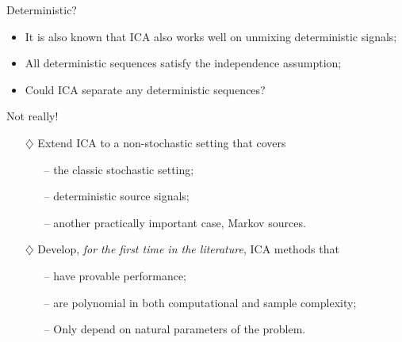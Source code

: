 \documentclass[final]{beamer} %
\begin{document}
\begin{frame}[c]
\begin{columns}[t,totalwidth=\textwidth]
	\begin{column}{.24\textwidth}%
		\begin{block}{Deterministic?}
			\begin{itemize}
				\item It is also known that ICA also works well on unmixing deterministic signals;
				\item All deterministic sequences satisfy the independence assumption;
				\item Could ICA separate any deterministic sequences?
			\end{itemize}
			\begin{center}
				{\large Not really!}
			\end{center}
			
			\vspace{1cm}
			\begin{tcolorbox}[title = \vspace{0.4cm}\textbf{\large Our Contributions} \vspace{0.4cm}, title filled, width = 0.9\textwidth, colback = uofagreen!10, colframe = red]
			\begin{itemize}
			\vspace{0.5cm}
			\item[$\diamondsuit$] Extend ICA to a non-stochastic setting that covers
			\begin{itemize}
			\item[--] the classic stochastic setting;
			\item[--] deterministic source signals;
			\item[--] another practically important case, Markov sources.
			\end{itemize} 
			\vspace{1cm}
			\item[$\diamondsuit$] Develop, \emph{for the first time in the literature}, ICA methods that 
				\begin{itemize}
					\item[--] have provable performance;
					\item[--] are polynomial in both computational and sample complexity;
					\item[--] Only depend on natural parameters of the problem.
				\end{itemize}
			\end{itemize}		
			\end{tcolorbox}
		\end{block}
		\vspace{0.5ex}

\end{column}
\end{columns}
\end{frame}
\end{document}
